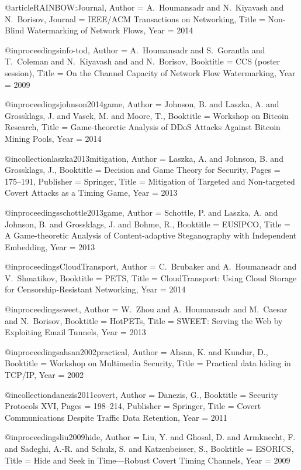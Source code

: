 {{@article{RAINBOW:Journal,
	Author = {A.~Houmansadr and N.~Kiyavash and N.~Borisov},
	Journal = {IEEE/ACM Transactions on Networking},
	Title = {{Non-Blind Watermarking of Network Flows}},
	Year = 2014}

@inproceedings{info-tod,
	Author = {A.~Houmansadr and S.~Gorantla and T.~Coleman and N.~Kiyavash and and N.~Borisov},
	Booktitle = {{CCS (poster session)}},
	Title = {{On the Channel Capacity of Network Flow Watermarking}},
	Year = {2009}}

@inproceedings{johnson2014game,
	Author = {Johnson, B. and Laszka, A. and Grossklags, J. and Vasek, M. and Moore, T.},
	Booktitle = {Workshop on Bitcoin Research},
	Title = {{Game-theoretic Analysis of DDoS Attacks Against Bitcoin Mining Pools}},
	Year = {2014}}

@incollection{laszka2013mitigation,
	Author = {Laszka, A. and Johnson, B. and Grossklags, J.},
	Booktitle = {Decision and Game Theory for Security},
	Pages = {175--191},
	Publisher = {Springer},
	Title = {{Mitigation of Targeted and Non-targeted Covert Attacks as a Timing Game}},
	Year = {2013}}

@inproceedings{schottle2013game,
	Author = {Schottle, P. and Laszka, A. and Johnson, B. and Grossklags, J. and Bohme, R.},
	Booktitle = {EUSIPCO},
	Title = {{A Game-theoretic Analysis of Content-adaptive Steganography with Independent Embedding}},
	Year = {2013}}

@inproceedings{CloudTransport,
	Author = {C.~Brubaker and A.~Houmansadr and V.~Shmatikov},
	Booktitle = {PETS},
	Title = {{CloudTransport: Using Cloud Storage for Censorship-Resistant Networking}},
	Year = {2014}}

@inproceedings{sweet,
	Author = {W.~Zhou and A.~Houmansadr and M.~Caesar and N.~Borisov},
	Booktitle = {HotPETs},
	Title = {{SWEET: Serving the Web by Exploiting Email Tunnels}},
	Year = {2013}}

@inproceedings{ahsan2002practical,
	Author = {Ahsan, K. and Kundur, D.},
	Booktitle = {Workshop on Multimedia Security},
	Title = {{Practical data hiding in TCP/IP}},
	Year = {2002}}

@incollection{danezis2011covert,
	Author = {Danezis, G.},
	Booktitle = {Security Protocols XVI},
	Pages = {198--214},
	Publisher = {Springer},
	Title = {{Covert Communications Despite Traffic Data Retention}},
	Year = {2011}}

@inproceedings{liu2009hide,
	Author = {Liu, Y. and Ghosal, D. and Armknecht, F. and Sadeghi, A.-R. and Schulz, S. and Katzenbeisser, S.},
	Booktitle = {ESORICS},
	Title = {{Hide and Seek in Time---Robust Covert Timing Channels}},
	Year = {2009}}

}}
